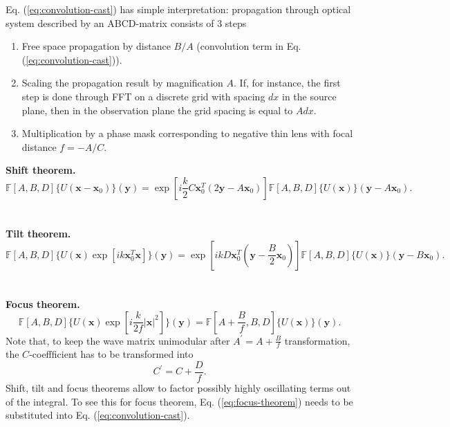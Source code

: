 Eq. (\ref{eq:convolution-cast}) has simple interpretation: propagation through
optical system described by an ABCD-matrix consists of 3 steps
\begin{enumerate}
  \item Free space propagation by distance $B/A$ (convolution term in Eq.
  (\ref{eq:convolution-cast})).
  \item Scaling the propagation result by magnification $A$. If, for instance,
  the first step is done through FFT on a discrete grid with spacing $dx$ in
  the source plane, then in the observation plane the grid spacing is equal to
  $Adx$.
  \item Multiplication by a phase mask corresponding to negative thin lens with
  focal distance $f = -A/C$. \\
\end{enumerate}
\textbf{Shift theorem.}
\begin{equation} \label{eq:shift-theorem}
  \mathbb{F}[A,B,D] \{ U(\bm{x}-\bm{x}_{0}) \} (\bm{y}) =
  \exp \left[
  i \frac{k}{2} C \bm{x}_{0}^{T} (2\bm{y}-A\bm{x}_{0})
  \right]
  \mathbb{F}[A,B,D] \{ U(\bm{x}) \} (\bm{y}-A\bm{x}_{0}).
\end{equation}
\\ \\
\textbf{Tilt theorem.}
\begin{equation} \label{eq:tilt-theorem}
  \mathbb{F}[A,B,D] \{ U(\bm{x}) \exp [ik\bm{x}_{0}^{T}\bm{x}] \} (\bm{y}) =
  \exp \left[
  ik D \bm{x}_{0}^{T} (\bm{y}-\frac{B}{2}\bm{x}_{0})
  \right]
  \mathbb{F}[A,B,D] \{ U(\bm{x}) \} (\bm{y}-B\bm{x}_{0}).
\end{equation}
\\ \\
\textbf{Focus theorem.}
\begin{equation} \label{eq:focus-theorem}
  \mathbb{F}[A,B,D] \{ U(\bm{x})
  \exp \left[ i \frac{k}{2f} |\bm{x}|^{2} \right] \}
  (\bm{y}) =
  \mathbb{F}[A+\frac{B}{f},B,D] \{ U(\bm{x}) \} (\bm{y}).
\end{equation}
Note that, to keep the wave matrix unimodular after $A^{\prime} = A +
\frac{B}{f}$ transformation, the $C$-coeffficient has to be transformed into
\begin{equation} \label{eq:c-correction}
  C^{\prime} = C + \frac{D}{f}.
\end{equation}
Shift, tilt and focus theorems allow to factor possibly highly oscillating
terms out of the integral. To see this for focus theorem, Eq.
(\ref{eq:focus-theorem}) needs to be substituted into Eq.
(\ref{eq:convolution-cast}).